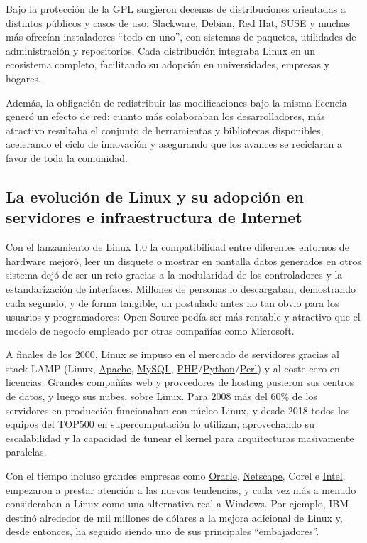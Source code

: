 \documentclass[a4paper,12pt]{article}
\begin{document}
Bajo la protección de la GPL surgieron decenas de distribuciones orientadas a
distintos públicos y casos de uso: \hyperlink{slackware}{Slackware}, \hyperlink{debian}{Debian}, 
\hyperlink{redhatcanonical}{Red Hat}, \hyperlink{suse}{SUSE} y muchas más
ofrecían instaladores ``todo en uno”, con sistemas de paquetes, utilidades de
administración y repositorios. Cada distribución integraba Linux en un
ecosistema completo, facilitando su adopción en universidades, empresas y
hogares.

Además, la obligación de redistribuir las modificaciones bajo la misma licencia 
generó un efecto de red: cuanto más colaboraban los desarrolladores, más
atractivo resultaba el conjunto de herramientas y bibliotecas disponibles,
acelerando el ciclo de innovación y asegurando que los avances se reciclaran a
favor de toda la comunidad.


\subsection{La evolución de Linux y su adopción en servidores e infraestructura de Internet}

Con el lanzamiento de Linux 1.0 la compatibilidad entre diferentes entornos de
hardware mejoró, leer un disquete o mostrar en pantalla datos generados en otros
sistema dejó de ser un reto gracias a la modularidad de los controladores y la
estandarización de interfaces. Millones de personas lo descargaban, demostrando
cada segundo, y de forma tangible, un postulado antes no tan obvio para los 
usuarios y programadores: Open Source podía ser más rentable y atractivo que el
modelo de negocio empleado por otras compañías como Microsoft.

A finales de los 2000, Linux se impuso en el mercado de servidores gracias al
stack LAMP (Linux, \hyperlink{apache}{Apache}, \hyperlink{mysql}{MySQL},
\hyperlink{php}{PHP}/\hyperlink{python}{Python}/\hyperlink{perl}{Perl}) y al
coste cero en licencias.  Grandes compañías web y proveedores de hosting
pusieron sus centros de datos, y luego sus nubes, sobre Linux. Para 2008 más del
60\% de los servidores en producción funcionaban con núcleo Linux, y desde 2018
todos los equipos del TOP500 en supercomputación lo utilizan, aprovechando su
escalabilidad y la 
capacidad de tunear el kernel para arquitecturas masivamente paralelas.

Con el tiempo incluso grandes empresas como \hyperlink{oracle}{Oracle}, \hyperlink{netscape}{Netscape}, Corel e \hyperlink{intel}{Intel},
empezaron a prestar atención a las nuevas tendencias, y cada vez más a menudo
consideraban a Linux como una alternativa real a Windows. Por ejemplo, IBM
destinó alrededor de mil millones de dólares a la mejora adicional de Linux y,
desde entonces, ha seguido siendo uno de sus principales “embajadores”.
\end{document}
